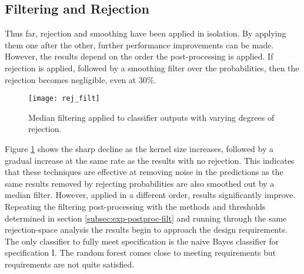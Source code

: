     \subsection{Filtering and Rejection}
    \label{subsec:exp-postproc-filtrej}
        Thus far, rejection and smoothing have been applied in isolation. By applying them one after the other, further performance improvements can be made. However, the results depend on the order the post-processing is applied. If rejection is applied, followed by a smoothing filter over the probabilities, then the rejection becomes negligible, even at $30\%$. 
        \begin{figure}[ht]
            \centering
            \texttt{[image: rej\_filt]}
            \caption{Median filtering applied to classifier outputs with varying degrees of rejection.}
            \label{fig:exp-postproc-rejfilt}
        \end{figure}
        Figure \ref{fig:exp-postproc-rejfilt} shows the sharp decline as the kernel size increases, followed by a gradual increase at the same rate as the results with no rejection. This indicates that these techniques are effective at removing noise in the predictions as the same results removed by rejecting probabilities are also smoothed out by a median filter. However, applied in a different order, results significantly improve. Repeating the filtering post-processing with the methods and thresholds determined in section \ref{subsec:exp-postproc-filt} and running through the same rejection-space analysis the results begin to approach the design requirements. The only classifier to fully meet specification is the naive Bayes classifier for specification I. The random forest comes close to meeting requirements but requirements are not quite satisfied. 